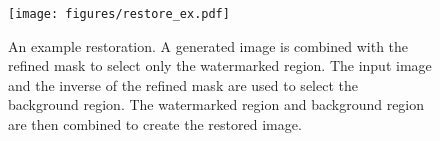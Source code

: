 \begin{figure}[t]
    \centering
    \texttt{[image: figures/restore\_ex.pdf]}
    \caption{An example restoration. A generated image is combined with the refined mask to select only the watermarked region. The input image and the inverse of the refined mask are used to select the background region. The watermarked region and background region are then combined to create the restored image.}
    \label{fig:restore_ex}
\end{figure}